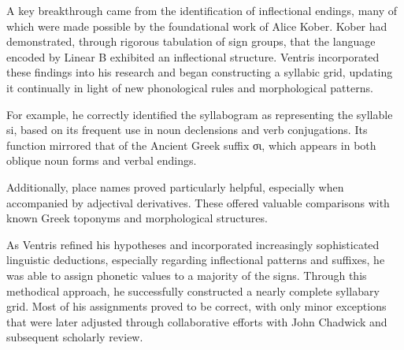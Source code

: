 A key breakthrough came from the identification of inflectional endings, many of which were made possible by the foundational work of Alice Kober.
Kober had demonstrated, through rigorous tabulation of sign groups, that the language encoded by Linear B exhibited an inflectional structure.
Ventris incorporated these findings into his research and began constructing a syllabic grid, updating it continually in light of new phonological rules and morphological patterns.

For example, he correctly identified the syllabogram \textlinb{\Bsi} as representing the syllable si, based on its frequent use in noun declensions and verb conjugations.
Its function mirrored that of the Ancient Greek suffix \textgreek{σι}, which appears in both oblique noun forms and verbal endings.

Additionally, place names proved particularly helpful, especially when accompanied by adjectival derivatives.
These offered valuable comparisons with known Greek toponyms and morphological structures.

As Ventris refined his hypotheses and incorporated increasingly sophisticated linguistic deductions, especially regarding inflectional patterns and suffixes, he was able to assign phonetic values to a majority of the signs.
Through this methodical approach, he successfully constructed a nearly complete syllabary grid.
Most of his assignments proved to be correct, with only minor exceptions that were later adjusted through collaborative efforts with John Chadwick and subsequent scholarly review. \cite{chad-ch4}

